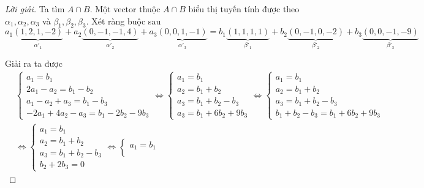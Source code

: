 \documentclass[class=linearalgebra,crop=false]{standalone}
\begin{document}
\begin{proof}[Lời giải]
    \par Ta tìm $A\cap B$. Một vector thuộc $A\cap B$ biểu thị tuyến tính được theo $\alpha_{1}, \alpha_{2}, \alpha_{3}$ và $\beta_{1}, \beta_{2}, \beta_{3}$. Xét ràng buộc sau
        \[ a_{1}\underbrace{(1,2,1,-2)}_{\alpha'_{1}} + a_{2}\underbrace{(0,-1,-1,4)}_{\alpha'_{2}} + a_{3}\underbrace{(0,0,1,-1)}_{\alpha'_{3}} = b_{1}\underbrace{(1,1,1,1)}_{\beta'_{1}} + b_{2}\underbrace{(0,-1,0,-2)}_{\beta'_{2}} + b_{3}\underbrace{(0,0,-1,-9)}_{\beta'_{3}} \]
    \par Giải ra ta được
        \begin{align*}
            &\begin{cases}
                a_{1} = b_{1} \\
                2a_{1} - a_{2} = b_{1} - b_{2} \\
                a_{1} - a_{2} + a_{3} = b_{1} - b_{3} \\
                -2a_{1} + 4a_{2} - a_{3} = b_{1} - 2b_{2} - 9b_{3}
            \end{cases}
            \Longleftrightarrow
            \begin{cases}
                a_{1} = b_{1} \\
                a_{2} = b_{1} + b_{2} \\
                a_{3} = b_{1} + b_{2} - b_{3} \\
                a_{3} = b_{1} + 6b_{2} + 9b_{3}
            \end{cases}
            \Longleftrightarrow
            \begin{cases}
                a_{1} = b_{1} \\
                a_{2} = b_{1} + b_{2} \\
                a_{3} = b_{1} + b_{2} - b_{3} \\
                b_{1} + b_{2} - b_{3} = b_{1} + 6b_{2} + 9b_{3}
            \end{cases} \\
            &\Longleftrightarrow\begin{cases}
                a_{1} = b_{1} \\
                a_{2} = b_{1} + b_{2} \\
                a_{3} = b_{1} + b_{2} - b_{3} \\
                b_{2} + 2b_{3} = 0
            \end{cases}
            \Longleftrightarrow
            \begin{cases}
                a_{1} = b_{1} \\

\end{cases}
\end{align*}
\end{proof}
\end{document}
